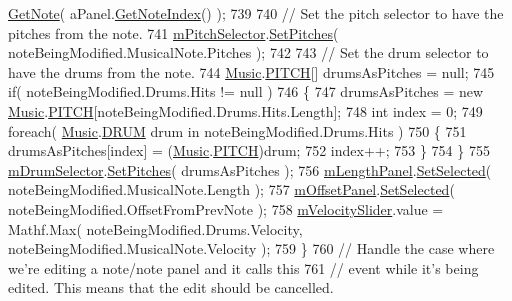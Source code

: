 \begin{DoxyCode}
      \hyperlink{group___song_const_ga485c83c9278103fed23c532bba1252f0}{GetNote}( aPanel.\hyperlink{group___s_c___n_d_p_unity_ga8beef050026ade4ba4ccb574c414d24e}{GetNoteIndex}() );
739 
740             \textcolor{comment}{// Set the pitch selector to have the pitches from the note.}
741             \hyperlink{group___s_c_priv_var_gac32e68713b2b504807f52acef445df1c}{mPitchSelector}.\hyperlink{group___s_c_handlers_ga906474015828cf26182e1f06f7094e00}{SetPitches}( noteBeingModified.MusicalNote.Pitches );
742 
743             \textcolor{comment}{// Set the drum selector to have the drums from the note.}
744             \hyperlink{class_music}{Music}.\hyperlink{group___music_enums_ga508f69b199ea518f935486c990edac1d}{PITCH}[] drumsAsPitches = null;
745             \textcolor{keywordflow}{if}( noteBeingModified.Drums.Hits != null )
746             \{
747                 drumsAsPitches = \textcolor{keyword}{new} \hyperlink{class_music}{Music}.\hyperlink{group___music_enums_ga508f69b199ea518f935486c990edac1d}{PITCH}[noteBeingModified.Drums.Hits.Length];
748                 \textcolor{keywordtype}{int} index = 0;
749                 \textcolor{keywordflow}{foreach}( \hyperlink{class_music}{Music}.\hyperlink{group___music_enums_gade475b4382c7066d1af13e7c13c029b6}{DRUM} drum in noteBeingModified.Drums.Hits )
750                 \{
751                     drumsAsPitches[index] = (\hyperlink{class_music}{Music}.\hyperlink{group___music_enums_ga508f69b199ea518f935486c990edac1d}{PITCH})drum;
752                     index++;
753                 \}
754             \}
755             \hyperlink{group___s_c_priv_var_ga3f1c71d8cabe505745220d728c6f97bc}{mDrumSelector}.\hyperlink{group___s_c_handlers_ga906474015828cf26182e1f06f7094e00}{SetPitches}( drumsAsPitches );
756             \hyperlink{group___s_c_priv_var_ga370237b50bc11a581fc963cdd8ffd4ea}{mLengthPanel}.\hyperlink{group___s_c_handlers_ga71307336af2197a0ee20bbaf3bfb02aa}{SetSelected}( noteBeingModified.MusicalNote.Length );
757             \hyperlink{group___s_c_priv_var_gafeeda8ab122f574c6fff94814234334c}{mOffsetPanel}.\hyperlink{group___s_c_handlers_ga71307336af2197a0ee20bbaf3bfb02aa}{SetSelected}( noteBeingModified.OffsetFromPrevNote );
758             \hyperlink{group___s_c_priv_var_ga0738678367556ebb69df6e73213f616d}{mVelocitySlider}.value = Mathf.Max( noteBeingModified.Drums.Velocity, 
      noteBeingModified.MusicalNote.Velocity );
759         \}
760         \textcolor{comment}{// Handle the case where we're editing a note/note panel and it calls this }
761         \textcolor{comment}{// event while it's being edited. This means that the edit should be cancelled.}

\end{DoxyCode}
